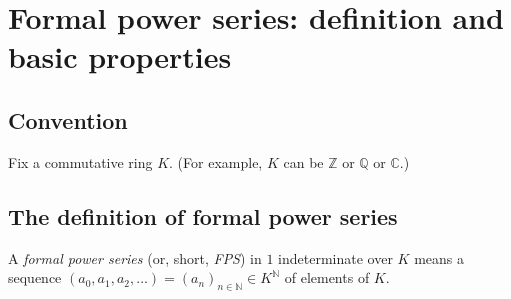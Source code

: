 \section{Formal power series: definition and basic properties}

\subsection{Convention}

Fix a commutative ring $K$. (For example, $K$ can be $\mathbb{Z}$ or
$\mathbb{Q}$ or $\mathbb{C}$.)

\subsection{The definition of formal power series}

\begin{definition}
\label{def.fps.fps}
\leantarget
\leanok
A \emph{formal power series} (or, short, \emph{FPS}) in $1$
indeterminate over $K$ means a sequence $\left(a_{0},a_{1},a_{2}%
,\ldots\right) = \left(a_{n}\right)_{n\in\mathbb{N}} \in K^{\mathbb{N}}$ of
elements of $K$.
\end{definition}

